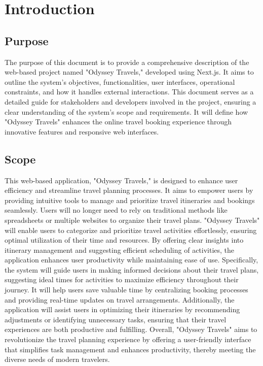 \documentclass{scrreprt}
\begin{document}
\chapter{Introduction}

\section{Purpose}
The purpose of this document is to provide a comprehensive description of the web-based project named "Odyssey Travels," developed using Next.js. It aims to outline the system’s objectives, functionalities, user interfaces, operational constraints, and how it handles external interactions. This document serves as a detailed guide for stakeholders and developers involved in the project, ensuring a clear understanding of the system’s scope and requirements. It will define how "Odyssey Travels" enhances the online travel booking experience through innovative features and responsive web interfaces.

\section{Scope}
This web-based application, "Odyssey Travels," is designed to enhance user efficiency and streamline travel planning processes. It aims to empower users by providing intuitive tools to manage and prioritize travel itineraries and bookings seamlessly. Users will no longer need to rely on traditional methods like spreadsheets or multiple websites to organize their travel plans.
"Odyssey Travels" will enable users to categorize and prioritize travel activities effortlessly, ensuring optimal utilization of their time and resources. By offering clear insights into itinerary management and suggesting efficient scheduling of activities, the application enhances user productivity while maintaining ease of use.
Specifically, the system will guide users in making informed decisions about their travel plans, suggesting ideal times for activities to maximize efficiency throughout their journey. It will help users save valuable time by centralizing booking processes and providing real-time updates on travel arrangements. Additionally, the application will assist users in optimizing their itineraries by recommending adjustments or identifying unnecessary tasks, ensuring that their travel experiences are both productive and fulfilling.
Overall, "Odyssey Travels" aims to revolutionize the travel planning experience by offering a user-friendly interface that simplifies task management and enhances productivity, thereby meeting the diverse needs of modern travelers.
\end{document}
